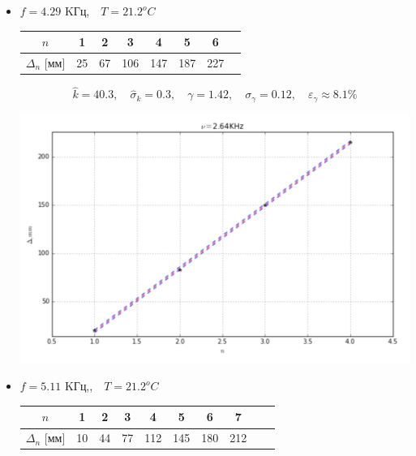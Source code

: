 \documentclass[12pt]{article}
\begin{document}
\begin{enumerate}
\begin{itemize}
        \item $f = 4.29$ KГц,$ \quad T = 21.2^o C$

        \begin{center}
                    \begin{tabular}{|c|c|c|c|c|c|c|c|}
                            \hline 
                                $n$ & 1 & 2 & 3 & 4 & 5 & 6 \\
                            \hline
                                $\Delta_n$ [мм]& 25&67&106&147&187&227\\
                            \hline
                    \end{tabular}
        \end{center}

        \begin{equation}
            \hat{k} = 40.3 ,\quad \hat{\sigma}_k = 0.3, \quad \gamma = 1.42, \quad \sigma_\gamma = 0.12, \quad \varepsilon_\gamma \approx 8.1\%
        \end{equation}

        \begin{center} 
            \includegraphics[width=5in]{2ex.png}
        \end{center}

        \item $f = 5.11$ KГц,,$ \quad T = 21.2^o C$

        \begin{center}
                    \begin{tabular}{|c|c|c|c|c|c|c|c|c|c|}
                            \hline 
                                $n$ & 1 & 2 & 3 & 4 & 5 & 6 & 7 \\
                            \hline
                                $\Delta_n$ [мм]& 10&44&77&112&145&180&212\\
                            \hline
                    \end{tabular}
        \end{center}


\end{itemize}
\end{enumerate}
\end{document}

